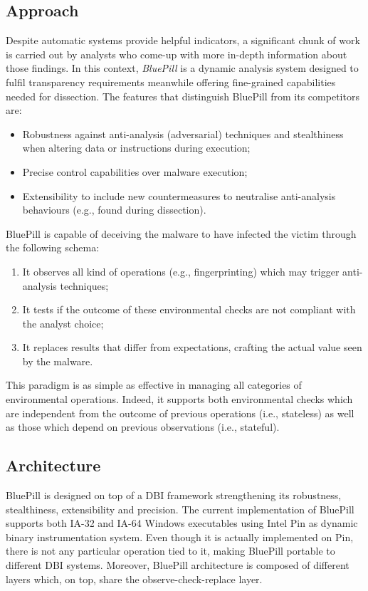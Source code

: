 \documentclass[LaM,binding=0.6cm]{sapthesis}
\begin{document}
\subsection{Approach}
Despite automatic systems provide helpful indicators, a significant chunk of work is carried out by analysts who come-up with more in-depth information about those findings. In this context, \textit{BluePill}\cite{bho} is a dynamic analysis system designed to fulfil transparency requirements meanwhile offering fine-grained capabilities needed for dissection. The features that distinguish BluePill from its competitors are:
\begin{itemize}
\item Robustness against anti-analysis (adversarial) techniques and stealthiness when altering data or instructions during execution;
\item Precise control capabilities over malware execution;
\item Extensibility to include new countermeasures to neutralise anti-analysis behaviours (e.g., found during dissection).
\end{itemize}
\newpage
BluePill is capable of deceiving the malware to have infected the victim through the following schema:
\begin{enumerate}
\item It observes all kind of operations (e.g., fingerprinting) which may trigger anti-analysis techniques;
\item It tests if the outcome of these environmental checks are not compliant with the analyst choice;
\item It replaces results that differ from expectations, crafting the actual value seen by the malware.  
\end{enumerate}
This paradigm is as simple as effective in managing all categories of environmental operations. Indeed, it supports both environmental checks which are independent from the outcome of previous operations (i.e., stateless) as well as those which depend on previous observations (i.e., stateful).

\subsection{Architecture}
BluePill is designed on top of a DBI framework strengthening its robustness, stealthiness, extensibility and precision. The current implementation of BluePill supports both IA-32 and IA-64 Windows executables using Intel Pin as dynamic binary instrumentation system. Even though it is actually implemented on Pin, there is not any particular operation tied to it, making BluePill portable to different DBI systems. Moreover, BluePill architecture is composed of different layers which, on top, share the observe-check-replace layer.
\end{document}

